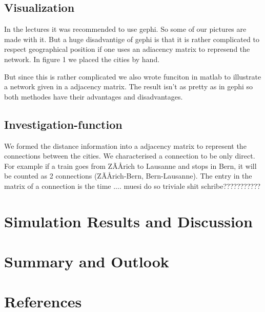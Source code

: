 \documentclass[11pt]{article}
\begin{document}
\subsection{Visualization}
In the lectures it was recommended to use gephi. So some of our pictures are made with it. But a huge disadvantige of gephi is that it is rather complicated to respect geographical position if one uses an adiacency  matrix to represend the network. In figure 1 we placed the cities by hand.

But since this is rather complicated we also wrote funciton in matlab to illustrate a network given in a adjacency matrix. The result isn't as pretty as in gephi so both methodes have their advantages and disadvantages.

\subsection{Investigation-function}




We formed the distance information into a adjacency matrix to represent the connections between the cities.  We characterised a connection to be only direct. For example if a train goes from ZÃÅrich to Lausanne and stops in Bern, it will be counted as 2 connections (ZÃÅrich-Bern, Bern-Lausanne). The entry in the matrix of a connection is the time .... muesi do so triviale shit schribe???????????




\section{Simulation Results and Discussion}

\section{Summary and Outlook}

\section{References}
\end{document}
